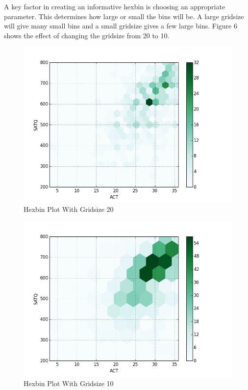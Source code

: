 A key factor in creating an informative hexbin is choosing an appropriate  parameter. This determines how large or small the bins will be. A large gridsize will give many small bins and a small gridsize gives a few large bins. Figure 6 shows the effect of changing the gridsize from 20 to 10.
\begin{figure}[H]
    \centering
    \includegraphics[width=.75\textwidth]{hexbin2.png}
    \caption{Hexbin Plot With Gridsize 20}
\end{figure}



\begin{figure}[H]
    \centering
    \includegraphics[width=.75\textwidth]{hexbin.png}
    \caption{Hexbin Plot With Gridsize 10}
\end{figure}





